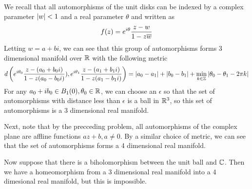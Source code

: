 \documentclass{homework}
\begin{document}
                                                                                                                                          \begin{solution}
                                                                                                                                          We recall that all automorphisms of the unit disks can be indexed by a complex parameter $\left|w\right| < 1$ and a real parameter $\theta$ and written as
                                                                                                                                          \[
                                                                                                                                          f(z) = e^{i\theta}\frac{z-w}{1 - z\overline{w}}
                                                                                                                                          \]
                                                                                                                                          Letting $w=a+bi$, we can see that this group of automorphisms forms 3 dimensional manifold over $\mathbb{R}$ with the following metric
                                                                                                                                          \[
                                                                                                                                          d\left(e^{i\theta_0}\frac{z-(a_0+b_0i)}{1 - z(a_0-b_0i)}), e^{i\theta_1}\frac{z-(a_1+b_1i)}{1 - z(a_1-b_1i)}\right) = 
                                                                                                                                          \left|a_0-a_1\right| + \left|b_0-b_1\right| + \min_{k\in \mathbb{Z}} \left|\theta_0-\theta_1-2\pi k\right|
                                                                                                                                          \]
                                                                                                                                          For any $a_0 + ib_0 \in B_1(0), \theta_0\in \mathbb{R}$, we can choose an $\epsilon$ so that the set of automorphisms with distance less than $\epsilon$ is a ball in $\mathbb{R}^3$, so this set of automorphisms is a 3 dimensional real manifold.

                                                                                                                                          Next, note that by the precceding problem, all automorphisms of the complex plane are affline functions $az+b, a\neq 0$. By a similar choice of metric, we can see that the set of automorphisms forms a 4 dimensional real manifold.

                                                                                                                                          Now suppose that there is a biholomorphism between the unit ball and $\mathbb{C}$. Then we have a homeomorphism from a 3 dimensional real manifold into a 4 dimesional real manifold, but this is impossible.
                                                                                                                                          \end{solution}
\end{document}
